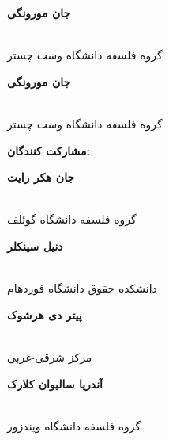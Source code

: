\documentclass[12pt,oneside]{book}
\begin{document}
\begin{multicols}{2}
        \begin{flushright}
            \begin{normalsize}
                \textbf{جان مورونگی}
            \end{normalsize}
            \\
            گروه فلسفه دانشگاه وست چستر
        \end{flushright}

        \begin{flushright}
            \begin{normalsize}
                \textbf{جان مورونگی}
            \end{normalsize}
            \\
            گروه فلسفه دانشگاه وست چستر
        \end{flushright}


        \begin{flushright}
            \begin{Large}
                \textbf{مشارکت کنندگان:}
            \end{Large}
        \end{flushright}

        \begin{flushright}
            \begin{normalsize}
                \textbf{جان هکر رایت}
            \end{normalsize}
            \\
            گروه فلسفه دانشگاه گوئلف
        \end{flushright}

        \begin{flushright}
            \begin{normalsize}
                \textbf{دنیل سینکلر}
            \end{normalsize}
            \\
            دانشکده حقوق دانشگاه فوردهام
        \end{flushright}

        \begin{flushright}
            \begin{normalsize}
                \textbf{پیتر دی هرشوک}
            \end{normalsize}
            \\
            مرکز شرقی-غربی
        \end{flushright}

        \begin{flushright}
            \begin{normalsize}
                \textbf{آندریا سالیوان کلارک}
            \end{normalsize}
            \\
            گروه فلسفه دانشگاه ویندزور
        \end{flushright}

    \end{multicols}
\end{document}
